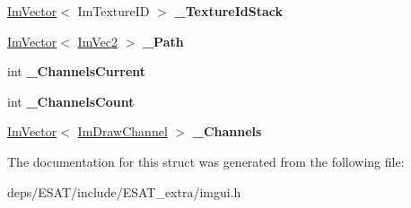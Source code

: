 \begin{DoxyCompactItemize}
\mbox{\hyperlink{class_im_vector}{Im\+Vector}}$<$ Im\+Texture\+ID $>$ {\bfseries \+\_\+\+Texture\+Id\+Stack}
\item 
\mbox{\label{struct_im_draw_list_a5bdc39abf351360500048628b8dc1b07}} 
\mbox{\hyperlink{class_im_vector}{Im\+Vector}}$<$ \mbox{\hyperlink{struct_im_vec2}{Im\+Vec2}} $>$ {\bfseries \+\_\+\+Path}
\item 
\mbox{\label{struct_im_draw_list_a143ff30108f3dca8c28c7925e23d358b}} 
int {\bfseries \+\_\+\+Channels\+Current}
\item 
\mbox{\label{struct_im_draw_list_ae3854c12dbac41400f4acb65192f5015}} 
int {\bfseries \+\_\+\+Channels\+Count}
\item 
\mbox{\label{struct_im_draw_list_ae6be941728e5b2c81a03c78e4aa22629}} 
\mbox{\hyperlink{class_im_vector}{Im\+Vector}}$<$ \mbox{\hyperlink{struct_im_draw_channel}{Im\+Draw\+Channel}} $>$ {\bfseries \+\_\+\+Channels}
\end{DoxyCompactItemize}


The documentation for this struct was generated from the following file\+:\begin{DoxyCompactItemize}
\item 
deps/\+E\+S\+A\+T/include/\+E\+S\+A\+T\+\_\+extra/imgui.\+h\end{DoxyCompactItemize}
